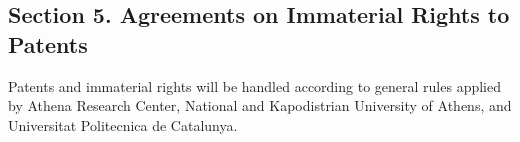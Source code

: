 \documentclass[12pt]{article}
\begin{document}




\subsection*{Section 5. Agreements on Immaterial Rights to Patents}

Patents and immaterial rights will be handled according to general rules applied by Athena Research Center, National and Kapodistrian University of Athens, and Universitat Politecnica de Catalunya.


\end{document}
